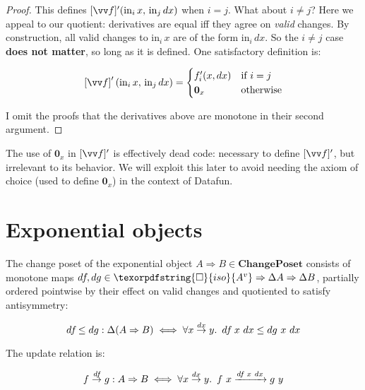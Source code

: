 \documentclass{rntz}
\newcommand\cat\textbf
\newcommand\strong\textbf
\newcommand\CP{\cat{ChangePoset}}
\newcommand\D\Delta
\newcommand\injc{\mathrm{in}}
\newcommand\inj[1]{\injc_{#1}\,}
\newcommand\zero{\ensuremath{\mathbold{0}}}
\newcommand\iso{\texorpdfstring{\ensuremath{\square}}{iso}}
\newcommand\isof[1]{\iso {#1}}
\newcommand\vals[1]{#1^v} %
\newcommand\chgs[1]{\D{#1}}
\newcommand\deriv[1]{#1'}
\newcommand\krof[1]{[{#1}]}
\newcommand\Krof[1]{\left[{#1}\right]}
\newcommand\bindsp{~\,}
\newcommand\fa[1]{\forall #1.\bindsp}
\newcommand\validarrow\to
\newcommand\vld[3]{{#2 \mathrel{\overset{#1}{\validarrow}} #3}}
\newcommand\longvld[3]{{#2 \xrightarrow{#1} #3}}
\begin{document}
\begin{proof}
  This defines $\deriv{\krof{\vv f}}(\inj i x,\, \inj j dx)$ when $i = j$. What
  about $i \ne j$? Here we appeal to our quotient: derivatives are equal iff
  they agree on \emph{valid} changes. By construction, all valid changes to
  $\inj i x$ are of the form $\inj i dx$. So the $i \ne j$ case \strong{does not
    matter}, so long as it is defined. One satisfactory definition is:

  \begin{equation*}
    \deriv{\Krof{\vv f}}(\inj i x,\, \inj j dx) = 
    \begin{cases}
      \deriv f_i(x,dx) & \text{if}~ i=j\\
      \zero_x & \text{otherwise}
    \end{cases}
  \end{equation*}

  I omit the proofs that the derivatives above are monotone in their second
  argument.
\end{proof}

\noindent
The use of $\zero_x$ in $\deriv{\krof{\vv f}}$ is effectively dead code:
necessary to define $\deriv{\krof{\vv f}}$, but irrelevant to its behavior. We
will exploit this later to avoid needing the axiom of choice (used to define
$\zero_x$) in the context of Datafun.


\section{Exponential objects}

\newcommand\expO[2]{#1 \Rightarrow #2}
\newcommand\df{d\kern-.1em f\kern-.1em} %

The change poset of the exponential object $\expO A B \in \CP$ consists of
monotone maps $\df, dg \in \expO{\isof{\vals A}}{\expO{\chgs A}{\chgs B}}$,
partially ordered pointwise by their effect on valid changes and quotiented to
satisfy antisymmetry:

\begin{equation*}
  \df \le dg : \chgs{(\expO A B)}
  \iff \fa{\vld{dx} x y} \df ~x ~dx \le dg ~x ~dx 
\end{equation*}

\noindent
The update relation is:

\begin{equation}\label{eqn:function-update}
  \vld{\df} f g : \expO A B
  \iff \fa{\vld{dx} x y} \longvld{\df~x~dx}{f~x}{g~y}
\end{equation}
\end{document}
